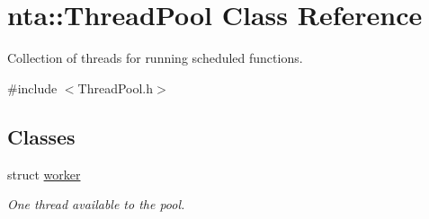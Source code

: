 \hypertarget{classnta_1_1ThreadPool}{}\section{nta\+:\+:Thread\+Pool Class Reference}
\label{classnta_1_1ThreadPool}


Collection of threads for running scheduled functions.  




{\ttfamily \#include $<$Thread\+Pool.\+h$>$}

\subsection*{Classes}
\begin{DoxyCompactItemize}
\item 
struct \hyperlink{structnta_1_1ThreadPool_1_1worker}{worker}
\begin{DoxyCompactList}\small\item\em One thread available to the pool. \end{DoxyCompactList}\end{DoxyCompactItemize}
